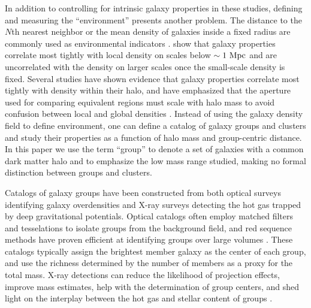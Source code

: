 In addition to controlling for intrinsic galaxy
properties in these studies, defining and measuring the
``environment'' presents another problem. The distance to the $N$th
nearest neighbor or the mean density of galaxies inside a fixed radius
are commonly used as environmental indicators
\citep[e.g.,][]{Dressler1980}. \citet{Kauffmann2004}
show that galaxy properties correlate most tightly with
local density on scales below $\sim1~\rm{Mpc}$ and are uncorrelated
with the density on larger scales once the small-scale density is
fixed. Several studies have shown evidence
that galaxy properties correlate most tightly with density within
their halo, and have emphasized that the aperture used for comparing
equivalent regions must scale with halo mass to avoid confusion
between local and global densities \citep{Hansen2005, Weinmann2006,
  Blanton2007, Haas2011}. Instead of using the galaxy density field to
define environment, one can define a catalog of galaxy groups and
clusters and study their properties as a function of halo mass and
group-centric distance. In this paper we use the term ``group'' to
denote a set of galaxies with a common dark matter halo and to
emphasize the low mass range studied, making no formal distinction
between groups and clusters.

Catalogs of galaxy groups have been constructed from both optical
surveys identifying galaxy overdensities and X-ray surveys detecting
the hot gas trapped by deep gravitational potentials. Optical catalogs
often employ matched filters \citep[e.g.,][]{Postman1996} and tesselations
\citep[e.g.,][]{Marinoni2002, Gerke2005} to isolate groups from the
background field, and red sequence methods have proven efficient at
identifying groups over large volumes \citep[e.g.,][]{Gladders2005,
  Koester2007b}. These catalogs 
typically assign the brightest member galaxy as the center of
each group, and use the richness determined by the number of members
as a proxy for the total mass. X-ray detections can reduce the
likelihood of projection effects, improve mass estimates, help with
the determination of group centers, and shed light on the interplay
between the hot gas and stellar content of groups
\citep[e.g.,][]{Mulchaey2003, Lin2004a, Finoguenov2007,
  Sun2009}.

